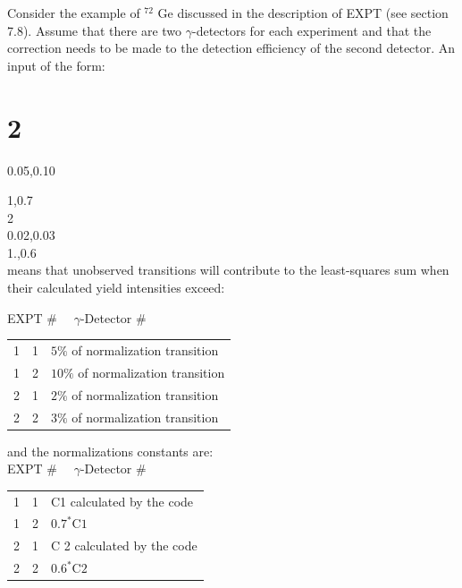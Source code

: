 \documentclass[10pt]{article}
\begin{document}
Consider the example of ${ }^{72}$ Ge discussed in the description of EXPT (see section 7.8). Assume that there are two $\gamma$-detectors for each experiment and that the correction needs to be made to the detection efficiency of the second detector. An input of the form:

\section*{2}
0.05,0.10

1,0.7\\
2\\
0.02,0.03\\
1.,0.6\\
means that unobserved transitions will contribute to the least-squares sum when their calculated yield intensities exceed:

EXPT \# $\quad \gamma$-Detector $\#$

\begin{center}
\begin{tabular}{lll}
1 & 1 & $5 \%$ of normalization transition \\
1 & 2 & $10 \%$ of normalization transition \\
2 & 1 & $2 \%$ of normalization transition \\
2 & 2 & $3 \%$ of normalization transition \\
\end{tabular}
\end{center}

and the normalizations constants are:\\
EXPT \# $\quad \gamma$-Detector $\#$

\begin{center}
\begin{tabular}{lll}
1 & 1 & C1 calculated by the code \\
1 & 2 & $0.7^{*} \mathrm{C} 1$ \\
2 & 1 & C 2 calculated by the code \\
2 & 2 & $0.6^{*} \mathrm{C} 2$ \\
\end{tabular}
\end{center}
\end{document}
